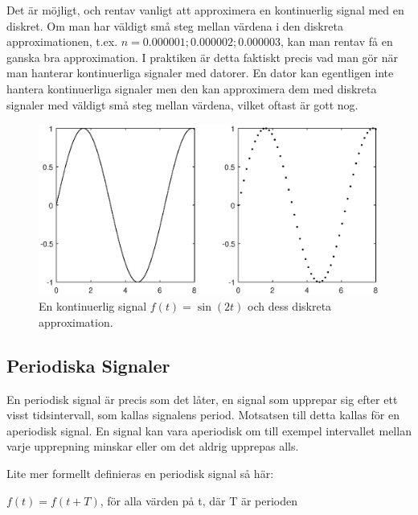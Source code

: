 \documentclass{article}
\begin{document}
Det är möjligt, och rentav vanligt att approximera en kontinuerlig signal
med en diskret. Om man har väldigt små steg mellan värdena i den diskreta
approximationen, t.ex. $n={0.000001 ; 0.000002 ; 0.000003}$, kan man rentav få
en ganska bra approximation. I praktiken är detta faktiskt precis vad man gör när
man hanterar kontinuerliga signaler med datorer. En dator kan egentligen inte
hantera kontinuerliga signaler men den kan approximera dem med diskreta signaler
med väldigt små steg mellan värdena, vilket oftast är gott nog.

\begin{figure}[ht]
\centerline{\includegraphics[scale=0.55]{images/diskretisering.eps}}
\caption{En kontinuerlig signal $f(t) = \sin(2 t)$ och dess diskreta approximation.}
\label{}
\end{figure}

\subsection{Periodiska Signaler}
En periodisk signal är precis som det låter, en signal som upprepar sig efter
ett visst tidsintervall, som kallas signalens period. Motsatsen till detta
kallas för en aperiodisk signal.
En signal kan vara aperiodisk om till exempel intervallet mellan varje
upprepning minskar eller om det aldrig upprepas alls.

Lite mer formellt definieras en periodisk signal så här:

$f(t) = f(t+T)$, för alla värden på t, där T är perioden
\end{document}
